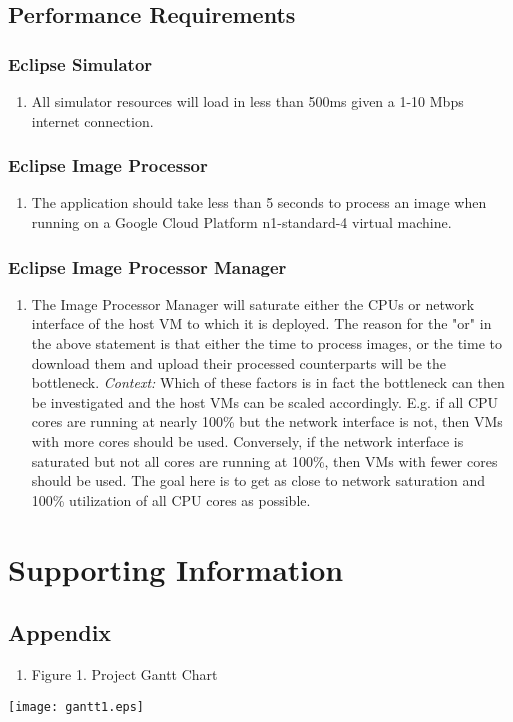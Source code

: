 \documentclass[10pt, onecolumn, draftclsnofoot, letterpaper, compsoc]{IEEEtran}
\begin{document}
\subsection{Performance Requirements}

\subsubsection{Eclipse Simulator}
	\begin{enumerate}
		\item All simulator resources will load in less than 500ms given a 1-10
		 Mbps internet connection.
	\end{enumerate}

\subsubsection{Eclipse Image Processor}
	\begin{enumerate}
		\item The application should take less than 5 seconds to process an
		 image when running on a Google Cloud Platform n1-standard-4 virtual
		 machine.
	\end{enumerate}

\subsubsection{Eclipse Image Processor Manager}
	\begin{enumerate}
		\item The Image Processor Manager will saturate either the CPUs or network interface of
		the host VM to which it is deployed. The reason for the "or" in the above statement is
		that either the time to process images, or the time to download them and upload their
		processed counterparts will be the bottleneck. \textit{Context:} Which of these factors
		is in fact the bottleneck can then be investigated and the host VMs can be scaled
		accordingly. E.g. if all CPU cores are running at nearly 100\% but the network interface
		is not, then VMs with more cores should be used. Conversely, if the network interface is
		saturated but not all cores are running at 100\%, then VMs with fewer cores should be used.
		The goal here is to get as close to network saturation and 100\% utilization of all CPU
		cores as possible.
	\end{enumerate}

\newpage
\section{Supporting Information}

\subsection{Appendix}

\begin{enumerate}
	\item Figure 1. Project Gantt Chart
\end{enumerate}

\begin{center}
	\texttt{[image: gantt1.eps]}
\end{center}
\end{document}

